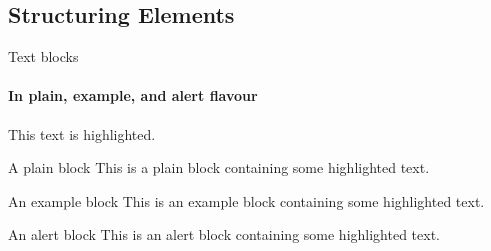 \documentclass{beamer}
\begin{document}
    \subsection{Structuring Elements}
    \begin{frame}[label=simmonshall]{Text blocks}
      \framesubtitle{In plain, example, and \alert{alert} flavour}
      \alert{This text} is highlighted.

      \begin{block}{A plain block}
        This is a plain block containing some \alert{highlighted text}.
      \end{block}
      \begin{exampleblock}{An example block}
        This is an example block containing some \alert{highlighted text}.
      \end{exampleblock}
      \begin{alertblock}{An alert block}
        This is an alert block containing some \alert{highlighted text}.
      \end{alertblock}
    \end{frame}
\end{document}
